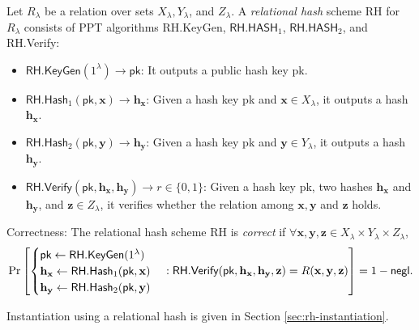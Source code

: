 \begin{definition}
\label{def:rh}
	Let $R_\lambda$ be a relation over sets $X_\lambda, Y_\lambda$, and $ Z_\lambda$. A \emph{relational hash} scheme \textsf{RH} for $R_\lambda$ consists of PPT algorithms \textsf{RH.KeyGen}, $\textsf{RH.HASH}_1$, $\textsf{RH.HASH}_2$, and \textsf{RH.Verify}:
	
	\begin{itemize}
	
		\item $\textsf{RH.KeyGen}(1^\lambda) \to \textsf{pk}$: It outputs a public hash key \textsf{pk}.  
			
		\item $\textsf{RH.Hash}_1(\textsf{pk}, \mathbf{x}) \to \mathbf{h_x}$: Given a hash key \textsf{pk} and $\mathbf{x} \in X_\lambda$, it outputs a hash $\mathbf{h_x}$.

		\item $\textsf{RH.Hash}_2(\textsf{pk}, \mathbf{y}) \to \mathbf{h_y}$: Given a hash key \textsf{pk} and $\mathbf{y} \in Y_\lambda$, it outputs a hash $\mathbf{h_y}$.

		\item $\textsf{RH.Verify}(\textsf{pk}, \mathbf{h_x}, \mathbf{h_y}) \to r \in \{0, 1\}$: Given a hash key \textsf{pk}, two hashes $\mathbf{h_x}$ and $\mathbf{h_y}$, and $\mathbf{z} \in Z_\lambda$, it verifies whether the relation among $\mathbf{x}, \mathbf{y}$ and $\mathbf{z}$ holds.

	\end{itemize}

	\noindent Correctness: The relational hash scheme \textsf{RH} is \emph{correct} if $\forall \mathbf{x}, \mathbf{y}, \mathbf{z} \in X_\lambda \times Y_\lambda \times Z_\lambda$,
	\[
		\Pr \left [
			\begin{cases} 
				 \textsf{pk} \gets \textsf{RH.KeyGen}(1^\lambda) \\
				 \mathbf{h_x} \gets \textsf{RH.Hash}_1(\textsf{pk}, \mathbf{x}) \\
				 \mathbf{h_y} \gets \textsf{RH.Hash}_2(\textsf{pk}, \mathbf{y})
			\end{cases} :
			\textsf{RH.Verify}(\textsf{pk}, \mathbf{h_x}, \mathbf{h_y}, \mathbf{z}) = R(\mathbf{x}, \mathbf{y}, \mathbf{z})
			\right ] = 1 - \mathsf{negl}.
	\]
\end{definition}

Instantiation using a relational hash is given in Section \ref{sec:rh-instantiation}.



